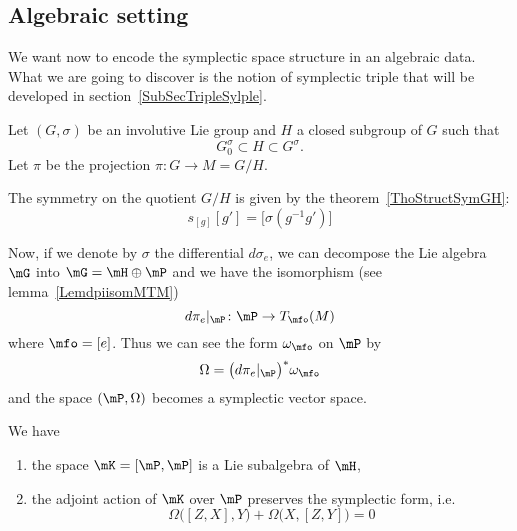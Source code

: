 \subsection{Algebraic setting}

We want now to encode the symplectic space structure in an algebraic data. What we are going to discover is the notion of symplectic triple that will be developed in section~\ref{SubSecTripleSylple}.

Let $(G,\sigma)$ be an involutive Lie group and $H$ a closed subgroup of $G$ such that
\begin{equation}
	G_0^{\sigma}\subset H\subset G^{\sigma}.
\end{equation}
Let $\pi$ be the projection $\pi\colon G\to M=G/H$.

The symmetry on the quotient $G/H$ is given by the theorem~\ref{ThoStructSymGH}:
\begin{equation}		\label{EaSymGH}
	s_{[g]}[g']=\big[ \sigma(g^{-1}g') \big]
\end{equation}

Now, if we denote by $\sigma$ the differential $d\sigma_e$, we can decompose the Lie algebra $\mG$ into $\mG=\mH\oplus\mP$ and we have the isomorphism (see lemma~\ref{LemdpiisomMTM})
\begin{equation}
	d\pi_e|_{\mP}\colon \mP\to T_{\mfo}(M)
\end{equation}
where $\mfo=[e]$. Thus we can see the form $\omega_{\mfo}$ on $\mP$ by
\begin{equation}
	\Omega=\big( d\pi_e|_{\mP} \big)^*\omega_{\mfo}
\end{equation}
and the space $(\mP,\Omega)$ becomes a symplectic vector space.

\begin{lemma}
	We have
	\begin{enumerate}

		\item
			the space $\mK=[\mP,\mP]$ is a Lie subalgebra of $\mH$,

		\item
			the adjoint action of $\mK$ over $\mP$ preserves the symplectic form, i.e.
			\begin{equation}
				\Omega\big( [Z,X],Y \big)+\Omega\big( X,[Z,Y] \big)=0
			\end{equation}

	\end{enumerate}

\end{lemma}

